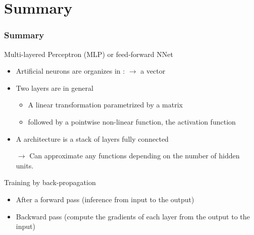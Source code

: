 \documentclass[10pt]{beamer}
\begin{document}
\section{Summary}
\begin{frame}
  \frametitle{Summary}
  \begin{block}{Multi-layered Perceptron (MLP) or feed-forward NNet}
    \begin{itemize}
    \item Artificial neurons are organizes in :  $\rightarrow$ a vector  
    \item Two layers are in general 
      \begin{itemize}
      \item A linear transformation parametrized by a matrix
      \item followed  by a pointwise non-linear function, the
        activation function
      \end{itemize}
    \item A  architecture is a stack of layers
      fully connected 
    \item[$\rightarrow$] Can approximate any functions depending on the number of hidden
      units. 
    \end{itemize}
  \end{block}
  \begin{block}{Training by back-propagation}
    \begin{itemize}
    \item After a forward pass (inference from input to the output) 
    \item Backward pass (compute the gradients of each layer from the
      output to the input)
    \end{itemize}
  \end{block}
\end{frame}



{\footnotesize }
\end{document}
